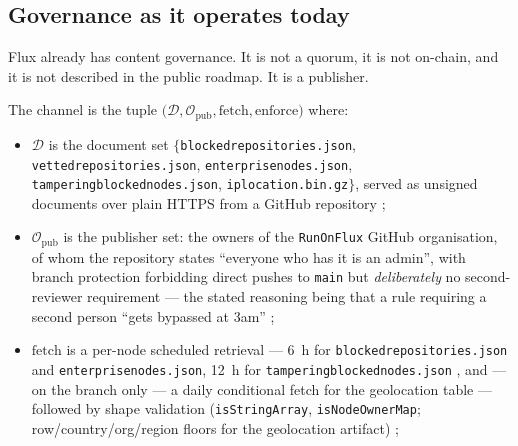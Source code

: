 \subsection{Governance as it operates today}
\label{sec:23:today}

Flux already has content governance. It is not a quorum, it is not on-chain, and it is not
described in the public roadmap. It is a publisher.

\begin{definition}
\label{def:23:policy-channel}
The channel is the tuple $\bigl(\mathcal{D}, \mathcal{O}_{\mathrm{pub}}, \mathrm{fetch},
\mathrm{enforce}\bigr)$ where:
\begin{itemize}
  \item $\mathcal{D}$ is the document set $\{$\texttt{blockedrepositories.\allowbreak{}json},
    \texttt{vettedrepositories.\allowbreak{}json}, \texttt{enterprisenodes.\allowbreak{}json},
    \texttt{tamperingblockednodes.\allowbreak{}json}, \texttt{iplocation.\allowbreak{}bin.\allowbreak{}gz}$\}$, served as unsigned
    documents over plain HTTPS from a GitHub repository
    ;
  \item $\mathcal{O}_{\mathrm{pub}}$ is the publisher set: the owners of the \texttt{RunOnFlux}
    GitHub organisation, of whom the repository states ``everyone who has it is an admin'', with
    branch protection forbidding direct pushes to \texttt{main} but \emph{deliberately} no
    second-reviewer requirement — the stated reasoning being that a rule requiring a second person
    ``gets bypassed at 3am'' 
    ;
  \item $\mathrm{fetch}$ is a per-node scheduled retrieval — \SI{6}{\hour} for
    \texttt{blockedrepositories.\allowbreak{}json} and \texttt{enterprisenodes.\allowbreak{}json}, \SI{12}{\hour} for
    \texttt{tamperingblockednodes.\allowbreak{}json} , and ---
    on the  branch only --- a daily conditional fetch for the geolocation table
     — followed by shape validation
    (\texttt{isStringArray}, \texttt{isNodeOwnerMap}; row/country/org/region floors for the
    geolocation artifact) ;

\end{itemize}
\end{definition}
